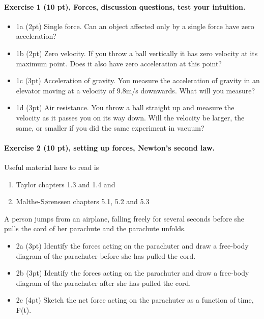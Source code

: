 \documentclass[%
oneside,                 %
final,                   %
10pt]{article}
\begin{document}
\noindent
\paragraph{Exercise 1 (10 pt), Forces, discussion questions, test your intuition.}
\begin{itemize}
\item 1a (2pt) Single force. Can an object affected only by a single force have zero acceleration?

\item 1b (2pt) Zero velocity. If you throw a ball vertically it has zero velocity at its maximum point. Does it also have zero acceleration at this point?

\item 1c (3pt) Acceleration of gravity. You measure the acceleration of gravity in an elevator moving at a velocity of 9.8m/s downwards. What will you measure?

\item 1d (3pt) Air resistance. You throw a ball straight up and measure the velocity as it passes you on its way down. Will the velocity be larger, the same, or smaller if you did the same experiment in vacuum?
\end{itemize}

\noindent
\paragraph{Exercise 2 (10 pt), setting up forces, Newton's second law.}
Useful material here to read is
\begin{enumerate}
\item Taylor chapters 1.3 and 1.4 and

\item Malthe-Sørenssen chapters 5.1, 5.2 and 5.3
\end{enumerate}

\noindent
A person jumps from an airplane, falling freely for several seconds before she pulls the cord of her parachute and the parachute unfolds.
\begin{itemize}
\item 2a (3pt)  Identify the forces acting on the parachuter and draw a free-body diagram of the parachuter before she has pulled the cord.

\item 2b (3pt)  Identify the forces acting on the parachuter and draw a free-body diagram of the parachuter after she has pulled the cord.

\item 2c (4pt)  Sketch the net force acting on the parachuter as a function of time, F(t).
\end{itemize}
\end{document}
